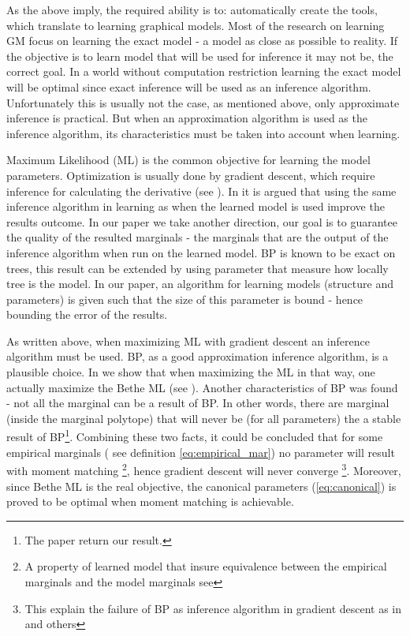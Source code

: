 As the above imply, the required ability is to: automatically create the tools, which translate to learning graphical models.
Most of the research on learning GM focus on learning the exact model - a model as close as possible to reality.
If the objective is to learn model that will be used for inference it may not be, the correct goal.
In a world without computation restriction learning the exact model will be optimal since exact inference will be used as an inference algorithm.
Unfortunately this is usually not the case, as mentioned above, only approximate inference is practical.
But when an approximation algorithm is used as the inference algorithm, its characteristics must be taken into account when learning.

Maximum Likelihood (ML) is the common objective for learning the model parameters.
Optimization is usually done by gradient descent, which require inference for calculating the derivative (see ).
In \cite{wainwright2006estimating} it is argued that using the same inference algorithm in learning as when the learned model is used improve the results outcome.
In our paper \cite{heinemann2014inferning} we take another direction, our goal is to guarantee the quality of the resulted marginals - the marginals that are the output of the inference algorithm when run on the learned model.
BP is known to be exact on trees, this result can be extended by using parameter that measure how locally tree is the model.
In our paper, an algorithm for learning models (structure and parameters) is given such that the size of this parameter is bound - hence bounding the error of the results.

As written above, when maximizing ML with gradient descent an inference algorithm must be used.
BP, as a good approximation inference algorithm, is a plausible choice.
In \cite{heinemann2012cannot} we show that when maximizing the ML in that way, one actually maximize the Bethe ML (see ).
Another characteristics of BP was found - not all the marginal can be a result of BP.
In other words, there are marginal (inside the marginal polytope) that will never be (for all parameters) the a stable result of BP\footnote{ The paper \cite{pitkow2011learning} return our result.}.
Combining these two facts, it could be concluded that for some empirical marginals ( see definition \eqref{eq:empirical_mar}) no parameter will result with moment matching \footnote{ A property of learned model that insure equivalence between the empirical marginals and the model marginals see }, hence gradient descent will never converge \footnote{This explain the failure of BP as inference algorithm in gradient descent as in \cite{wainwright2006estimating} and others}.
Moreover, since Bethe ML is the real objective, the canonical parameters (\eqref{eq:canonical}) is proved to be optimal when moment matching is achievable.


